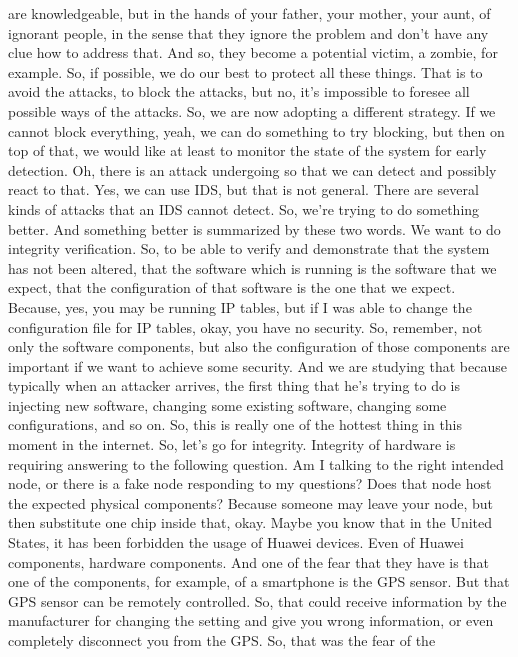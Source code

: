  are knowledgeable, but in the hands of your father, your mother, your aunt, of
 ignorant people, in the sense that they ignore the problem and don't have any
 clue how to address that. And so, they become a potential victim, a zombie,
 for example. So, if possible, we do our best to protect all these things. That
 is to avoid the attacks, to block the attacks, but no, it's impossible to
 foresee all possible ways of the attacks. So, we are now adopting a different
 strategy. If we cannot block everything, yeah, we can do something to try
 blocking, but then on top of that, we would like at least to monitor the state
 of the system for early detection. Oh, there is an attack undergoing so that
 we can detect and possibly react to that. Yes, we can use IDS, but that is not
 general. There are several kinds of attacks that an IDS cannot detect. So,
 we're trying to do something better. And something better is summarized by
 these two words. We want to do integrity verification. So, to be able to
 verify and demonstrate that the system has not been altered, that the software
 which is running is the software that we expect, that the configuration of
 that software is the one that we expect. Because, yes, you may be running IP
 tables, but if I was able to change the configuration file for IP tables,
 okay, you have no security. So, remember, not only the software components,
 but also the configuration of those components are important if we want to
 achieve some security. And we are studying that because typically when an
 attacker arrives, the first thing that he's trying to do is injecting new
 software, changing some existing software, changing some configurations, and
 so on. So, this is really one of the hottest thing in this moment in the
 internet. So, let's go for integrity. Integrity of hardware is requiring
 answering to the following question. Am I talking to the right intended node,
 or there is a fake node responding to my questions? Does that node host the
 expected physical components? Because someone may leave your node, but then
 substitute one chip inside that, okay. Maybe you know that in the United
 States, it has been forbidden the usage of Huawei devices. Even of Huawei
 components, hardware components. And one of the fear that they have is that
 one of the components, for example, of a smartphone is the GPS sensor. But
 that GPS sensor can be remotely controlled. So, that could receive information
 by the manufacturer for changing the setting and give you wrong information,
 or even completely disconnect you from the GPS. So, that was the fear of the
